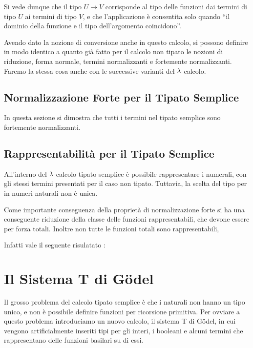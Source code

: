 \documentclass[]{marticle}
\begin{document}
Si vede dunque che il tipo $U\rightarrow V$ corrisponde al tipo delle funzioni
dai termini di tipo $U$ ai termini di tipo $V$, e che l'applicazione \`e
consentita solo quando ``il dominio della funzione e il tipo dell'argomento
coincidono''.

Avendo dato la nozione di conversione anche in questo calcolo, si possono
definire in modo identico a quanto gi\`a fatto per il calcolo non tipato le
nozioni di riduzione, forma normale, termini normalizzanti e fortemente
normalizzanti. Faremo la stessa cosa anche con le successive varianti del
$\lambda$-calcolo.

\subsection{Normalizzazione Forte per il Tipato Semplice}
In questa sezione si dimostra che tutti i termini nel tipato semplice sono
fortemente normalizzanti.


\subsection{Rappresentabilit\`a per il Tipato Semplice}
All'interno del $\lambda$-calcolo tipato semplice \`e possibile rappresentare i
numerali, con gli stessi termini presentati per il caso non tipato. Tuttavia, la
scelta del tipo per in numeri naturali non \`e unica.

Come importante conseguenza della propriet\`a di normalizzazione forte si ha una
conseguente riduzione della classe delle funzioni rappresentabili, che devone
essere per forza totali. Inoltre non tutte le funzioni totali sono
rappresentabili, 


Infatti vale il seguente risulatato :

\begin{block}[Teorema]
\end{block}

\section{Il Sistema T di G\"odel}

Il grosso problema del calcolo tipato semplice \`e che i naturali non hanno un
tipo unico, e non \`e possibile definire funzioni per ricorsione primitiva. Per
ovviare a questo problema introduciamo un nuovo calcolo, il sistema T di
G\"odel, in cui vengono artificialmente inseriti tipi per gli interi, i booleani
e alcuni termini che rappresentano delle funzioni basilari su di essi.
\end{document}
